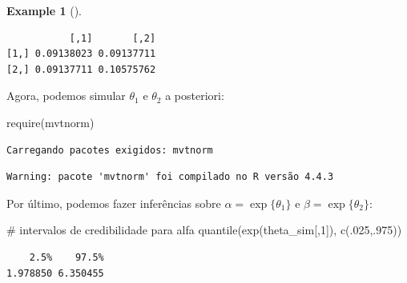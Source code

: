 \documentclass[
  letterpaper,
  DIV=11,
  numbers=noendperiod]{scrreprt}
\newenvironment{Shaded}{\begin{snugshade}}{\end{snugshade}}
\newcommand{\CommentTok}[1]{\textcolor[rgb]{0.37,0.37,0.37}{#1}}
\newcommand{\DecValTok}[1]{\textcolor[rgb]{0.68,0.00,0.00}{#1}}
\newcommand{\FunctionTok}[1]{\textcolor[rgb]{0.28,0.35,0.67}{#1}}
\newcommand{\NormalTok}[1]{\textcolor[rgb]{0.00,0.23,0.31}{#1}}
\newcommand{\OtherTok}[1]{\textcolor[rgb]{0.00,0.23,0.31}{#1}}
\newcommand{\SpecialCharTok}[1]{\textcolor[rgb]{0.37,0.37,0.37}{#1}}
\theoremstyle{definition}
\theoremstyle{plain}
\theoremstyle{definition}
\newtheorem{example}{Example}[chapter]
\theoremstyle{remark}
\begin{document}
\begin{example}[]
\begin{Shaded}
\end{Shaded}

\begin{verbatim}
           [,1]       [,2]
[1,] 0.09138023 0.09137711
[2,] 0.09137711 0.10575762
\end{verbatim}

Agora, podemos simular \(\theta_1\) e \(\theta_2\) a posteriori:

\begin{Shaded}
\begin{Highlighting}[]
\FunctionTok{require}\NormalTok{(mvtnorm)}
\end{Highlighting}
\end{Shaded}

\begin{verbatim}
Carregando pacotes exigidos: mvtnorm
\end{verbatim}

\begin{verbatim}
Warning: pacote 'mvtnorm' foi compilado no R versão 4.4.3
\end{verbatim}

\begin{Shaded}
\end{Shaded}

Por último, podemos fazer inferências sobre \(\alpha=\exp\{\theta_1\}\)
e \(\beta=\exp\{\theta_2\}\):

\begin{Shaded}
\begin{Highlighting}[]
\CommentTok{\# intervalos de credibilidade para alfa}
\FunctionTok{quantile}\NormalTok{(}\FunctionTok{exp}\NormalTok{(theta\_sim[,}\DecValTok{1}\NormalTok{]), }\FunctionTok{c}\NormalTok{(.}\DecValTok{025}\NormalTok{,.}\DecValTok{975}\NormalTok{))}
\end{Highlighting}
\end{Shaded}

\begin{verbatim}
    2.5%    97.5% 
1.978850 6.350455 
\end{verbatim}


\end{example}
\end{document}
